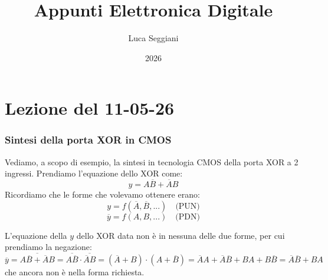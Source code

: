 \documentclass[a4paper,11pt]{article}
\title{Appunti Elettronica Digitale}
\author{Luca Seggiani}
\date{2026}
\begin{document}
\section{Lezione del 11-05-26}

\thispagestyle{empty}
\pagestyle{fancy}

\subsubsection{Sintesi della porta XOR in CMOS}
Vediamo, a scopo di esempio, la sintesi in tecnologia CMOS della porta XOR a 2 ingressi. Prendiamo l'equazione dello XOR come:
$$
y = A \overline{B} + \overline{A} B
$$
Ricordiamo che le forme che volevamo ottenere erano:
$$
y = f \left( \overline{A}, \overline{B}, ... \right) \quad \text{(PUN)}
$$
$$
\overline{y} = f \left( A, B, ... \right) \quad \text{(PDN)}
$$

L'equazione della $y$ dello XOR data non è in nessuna delle due forme, per cui prendiamo la negazione:
$$
\overline{y} = \overline{ A \overline{B} + \overline{A} B } = \overline{ A \overline{B} } \cdot \overline{ \overline{A} B } = \left( \overline{A} + B \right) \cdot \left( A + \overline{B} \right) = \overline{A} A + \overline{A} \overline{B} + B A + B \overline{B} = \overline{A} \overline{B} + B A
$$
che ancora non è nella forma richiesta. 
\end{document}
